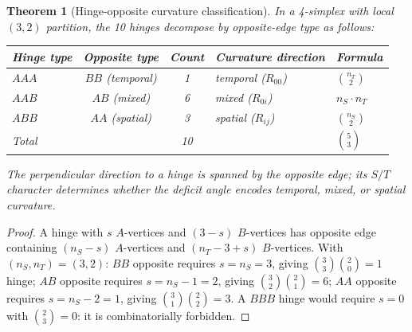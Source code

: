 \documentclass[12pt,a4paper]{article}
\newtheorem{theorem}{Theorem}[section]
\newcommand{\nS}{n_S}
\newcommand{\nT}{n_T}
\begin{document}
\begin{theorem}[Hinge-opposite curvature classification]
\label{thm:opposite}
In a 4-simplex with local $(3,2)$ partition, the 10 hinges
decompose by opposite-edge type as follows:
\begin{center}
\begin{tabular}{lccll}
\toprule
Hinge type & Opposite type & Count & Curvature direction & Formula \\
\midrule
$AAA$ & $BB$ (temporal) & 1 & temporal ($R_{00}$) & $\binom{\nT}{2}$ \\
$AAB$ & $AB$ (mixed)    & 6 & mixed ($R_{0i}$)    & $\nS\cdot\nT$ \\
$ABB$ & $AA$ (spatial)  & 3 & spatial ($R_{ij}$)   & $\binom{\nS}{2}$ \\
\midrule
Total &                  & 10 &                     & $\binom{5}{3}$ \\
\bottomrule
\end{tabular}
\end{center}
The perpendicular direction to a hinge is spanned by the
opposite edge; its $S/T$ character determines whether the
deficit angle encodes temporal, mixed, or spatial curvature.
\end{theorem}

\begin{proof}
A hinge with $s$ $A$-vertices and $(3-s)$ $B$-vertices has
opposite edge containing $(n_S - s)$ $A$-vertices and
$(n_T - 3 + s)$ $B$-vertices. With $(n_S,n_T)=(3,2)$:
$BB$ opposite requires $s = n_S = 3$, giving $\binom{3}{3}\binom{2}{0} = 1$ hinge;
$AB$ opposite requires $s = n_S-1 = 2$, giving $\binom{3}{2}\binom{2}{1} = 6$;
$AA$ opposite requires $s = n_S-2 = 1$, giving $\binom{3}{1}\binom{2}{2} = 3$.
A $BBB$ hinge would require $s = 0$ with $\binom{2}{3} = 0$:
it is combinatorially forbidden.
\end{proof}
\end{document}
